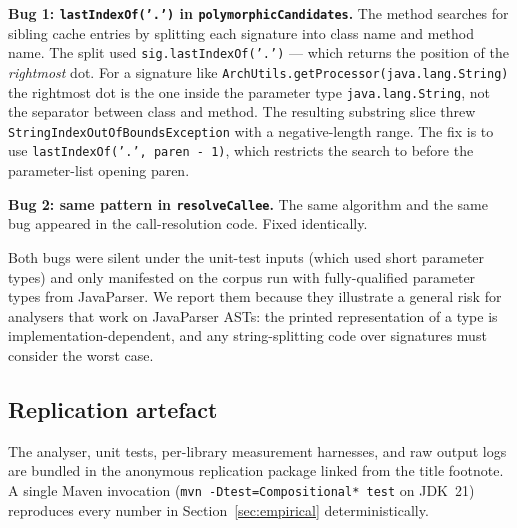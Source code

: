 \textbf{Bug 1: \texttt{lastIndexOf('.')} in \texttt{polymorphicCandidates}.}
The method searches for sibling cache entries by splitting each
signature into class name and method name. The split used
\texttt{sig.lastIndexOf('.')} --- which returns the position of the
\emph{rightmost} dot. For a signature like
\texttt{ArchUtils.getProcessor(java.lang.String)} the rightmost dot is
the one inside the parameter type \texttt{java.lang.String}, not the
separator between class and method. The resulting substring slice
threw \texttt{StringIndexOutOfBoundsException} with a negative-length
range. The fix is to use \texttt{lastIndexOf('.', paren - 1)}, which
restricts the search to before the parameter-list opening paren.

\textbf{Bug 2: same pattern in \texttt{resolveCallee}.} The same
algorithm and the same bug appeared in the call-resolution code.
Fixed identically.

Both bugs were silent under the unit-test inputs (which used short
parameter types) and only manifested on the corpus run with
fully-qualified parameter types from JavaParser. We report them
because they illustrate a general risk for analysers that work on
JavaParser ASTs: the printed representation of a type is
implementation-dependent, and any string-splitting code over
signatures must consider the worst case.

\subsection{Replication artefact}

The analyser, unit tests, per-library measurement harnesses, and
raw output logs are bundled in the anonymous replication package
linked from the title footnote. A single Maven invocation
(\texttt{mvn -Dtest=Compositional* test} on JDK~21) reproduces
every number in Section~\ref{sec:empirical} deterministically.
